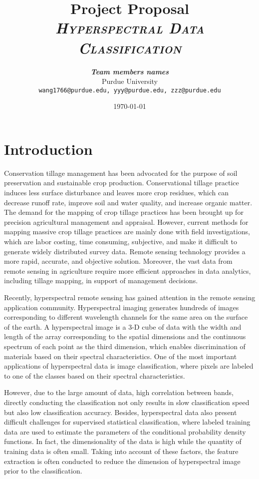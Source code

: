 \documentclass[11pt]{article}
\title{
\textbf{Project Proposal} \\ \textsc{\textit{Hyperspectral Data Classification}} \\
}
\author{
	\textbf{\textit{Team members names}} \\
	Purdue University\\
	\texttt{wang1766@purdue.edu, yyy@purdue.edu, zzz@purdue.edu}
}
\date{\today}
\begin{document}
\maketitle


\section{Introduction}

Conservation tillage management has been advocated for the purpose of soil preservation and sustainable crop production. Conservational tillage practice induces less surface disturbance and leaves more crop residues, which can decrease runoff rate, improve soil and water quality, and increase organic matter. The demand for the mapping of crop tillage practices has been brought up for precision agricultural management and appraisal. However, current methods for mapping massive crop tillage practices are mainly done with field investigations, which are labor costing, time consuming, subjective, and make it difficult to generate widely distributed survey data. Remote sensing technology provides a more rapid, accurate, and objective solution. Moreover, the vast data from remote sensing in agriculture require more efficient approaches in data analytics, including tillage mapping, in support of management decisions. 

Recently, hyperspectral remote sensing has gained attention in the remote sensing application community. Hyperspectral imaging generates hundreds of images corresponding to different wavelength channels for the same area on the surface of the earth. A hyperspectral image is a 3-D cube of data with the width and length of the array corresponding to the spatial dimensions and the continuous spectrum of each point as the third dimension, which enables discrimination of materials based on their spectral characteristics. One of the most important applications of hyperspectral data is image classification, where pixels are labeled to one of the classes based on their spectral characteristics. 

However, due to the large amount of data, high correlation between bands, directly conducting the classification not only results in slow classification speed but also low classification accuracy. Besides, hyperspectral data also present difficult challenges for supervised statistical classification, where labeled training data are used to estimate the parameters of the conditional probability density functions. In fact, the dimensionality of the data is high while the quantity of training data is often small. Taking into account of these factors, the feature extraction is often conducted to reduce the dimension of hyperspectral image prior to the classification. 
\end{document}
